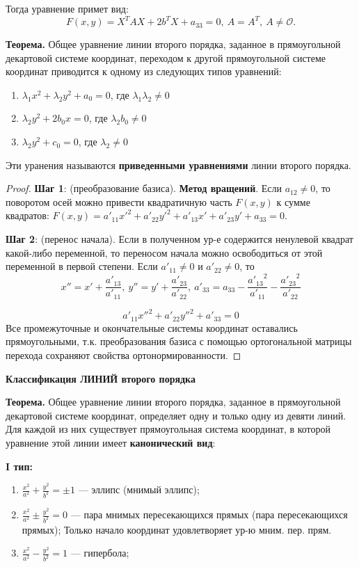 Тогда уравнение примет вид:
$$F(x,y) = X^TAX+2b^TX+a_{33}=0,~A=A^T,~A\neq\mathcal{O}.$$

\textbf{Теорема.} Общее уравнение линии второго порядка, заданное в прямоугольной декартовой системе координат, переходом к другой прямоугольной системе координат приводится к одному из следующих типов уравнений:
\begin{enumerate}
    \item $\lambda_1 x^2 + \lambda_2 y^2 + a_0 = 0$, где $\lambda_1\lambda_2\neq 0$
    \item $\lambda_2 y^2 + 2b_0x = 0$, где $\lambda_2 b_0\neq 0$
    \item $\lambda_2 y^2 + c_0 = 0$, где $\lambda_2\neq 0$
\end{enumerate}
Эти уранения называются \textbf{приведенными уравнениями} линии второго порядка.

\begin{proof}
\textbf{Шаг 1}: (преобразование базиса). \textbf{Метод вращений}. Если $a_{12} \neq 0$, то поворотом осей можно привести квадратичную часть $F(x,y)$ к сумме квадратов: $F(x,y) = a'_{11}x'^{2} + a'_{22}y'^{2} + a'_{13}x' + a'_{23}y' + a_{33} = 0$.

\textbf{Шаг 2}: (перенос начала). Если в полученном ур-е содержится ненулевой квадрат какой-либо переменной, то переносом начала можно освободиться от этой переменной в первой степени. Если $a'_{11} \neq 0$ и $a'_{22} \neq 0$, то 
$$
x'' = x' + \frac{a'_{13}}{a'_{11}}, \ y'' = y' + \frac{a'_{23}}{a'_{22}}, \ a'_{33} = a_{33} - \frac{{a'_{13}}^2}{a'_{11}} - \frac{{a'_{23}}^2}{a'_{22}}
$$

$$
a'_{11}x''^{2} + a'_{22}y''^{2} + a'_{33} = 0
$$
Все промежуточные и окончательные системы координат оставались прямоугольными, т.к. преобразования базиса с помощью ортогональной матрицы перехода сохраняют свойства ортонормированности.
\end{proof}


\textbf{Классификация ЛИНИЙ второго порядка}

\textbf{Теорема.} Общее уравнение линии второго порядка, заданное в прямоугольной декартовой системе координат, определяет одну и только одну из девяти линий. Для каждой из них существует прямоугольная система координат, в которой уравнение этой линии имеет \textbf{канонический вид}:

\textbf{I тип:}
\begin{enumerate}
    \item $\frac{x^2}{a^2} + \frac{y^2}{b^2} = \pm1$ --- эллипс (мнимый эллипс);
    \item $\frac{x^2}{a^2} \pm \frac{y^2}{b^2} = 0$ --- пара мнимых пересекающихся прямых (пара пересекающихся прямых); Только начало координат удовлетворяет ур-ю мним. пер. прям.
    \item $\frac{x^2}{a^2} - \frac{y^2}{b^2} = 1$ --- гипербола;
\end{enumerate}


